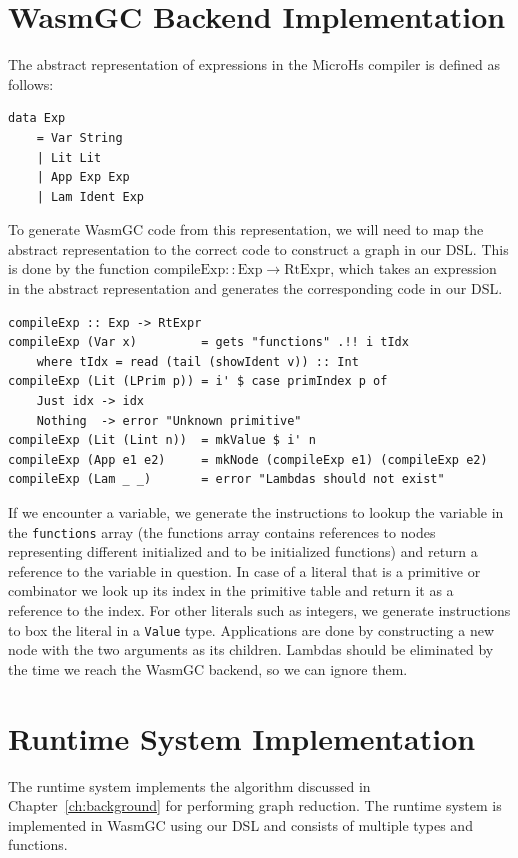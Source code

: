 \section{WasmGC Backend Implementation}
The abstract representation of expressions in the MicroHs compiler is defined as follows:
\begin{verbatim}
data Exp
    = Var String
    | Lit Lit
    | App Exp Exp
    | Lam Ident Exp
\end{verbatim}
To generate WasmGC code from this representation, we will need to map the abstract representation to the correct code to construct a graph in our DSL. This is done by the function \texttt{$\text{compileExp} :: \text{Exp} \rightarrow \text{RtExpr}$}, which takes an expression in the abstract representation and generates the corresponding code in our DSL.
\begin{verbatim}
compileExp :: Exp -> RtExpr
compileExp (Var x)         = gets "functions" .!! i tIdx
    where tIdx = read (tail (showIdent v)) :: Int
compileExp (Lit (LPrim p)) = i' $ case primIndex p of
    Just idx -> idx
    Nothing  -> error "Unknown primitive"
compileExp (Lit (Lint n))  = mkValue $ i' n
compileExp (App e1 e2)     = mkNode (compileExp e1) (compileExp e2)
compileExp (Lam _ _)       = error "Lambdas should not exist"
\end{verbatim}
If we encounter a variable, we generate the instructions to lookup the variable in the \texttt{functions} array (the functions array contains references to nodes representing different initialized and to be initialized functions) and return a reference to the variable in question. In case of a literal that is a primitive or combinator we look up its index in the primitive table and return it as a reference to the index. For other literals such as integers, we generate instructions to box the literal in a \texttt{Value} type. Applications are done by constructing a new node with the two arguments as its children. Lambdas should be eliminated by the time we reach the WasmGC backend, so we can ignore them.

\section{Runtime System Implementation}
The runtime system implements the algorithm discussed in Chapter~\ref{ch:background} for performing graph reduction. The runtime system is implemented in WasmGC using our DSL and consists of multiple types and functions.

